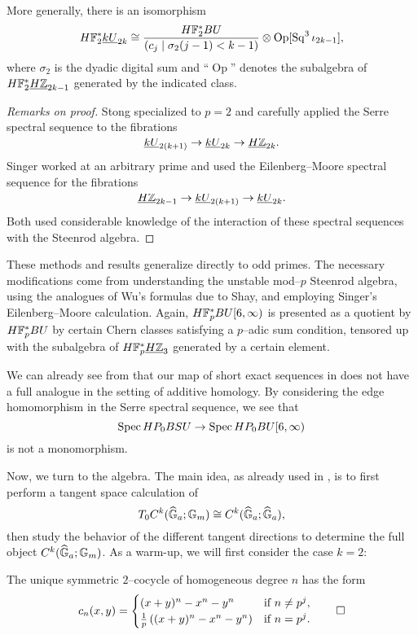 \begin{theorem}
More generally, there is an isomorphism \[H\mathbb F_2^* \underline{\smash{kU}}_{2k} \cong \frac{H\mathbb F_2^* BU}{(c_j \mid \sigma_2(j - 1) < k - 1)} \otimes \operatorname{Op}[\operatorname{Sq}^3 \iota_{2k-1}],\] where $\sigma_2$ is the dyadic digital sum and ``$\operatorname{Op}$'' denotes the subalgebra of $H\mathbb F_2^* \underline{\smash{H\mathbb Z}}_{2k-1}$ generated by the indicated class.
\end{theorem}
\begin{proof}[Remarks on proof]
Stong specialized to $p = 2$ and carefully applied the Serre spectral sequence to the fibrations \[\underline{\smash{kU}}_{2(k+1)} \to \underline{\smash{kU}}_{2k} \to \underline{\smash{H\mathbb Z}}_{2k}.\]  Singer worked at an arbitrary prime and used the Eilenberg--Moore spectral sequence for the fibrations \[\underline{\smash{H\mathbb Z}}_{2k-1} \to \underline{\smash{kU}}_{2(k+1)} \to \underline{\smash{kU}}_{2k}.\]  Both used considerable knowledge of the interaction of these spectral sequences with the Steenrod algebra.
\end{proof}

\begin{remark}
These methods and results generalize directly to odd primes.  The necessary modifications come from understanding the unstable mod--$p$ Steenrod algebra, using the analogues of Wu's formulas due to Shay, and employing Singer's Eilenberg--Moore calculation.  Again, $H\mathbb F_p^* BU[6, \infty)$ is presented as a quotient by $H\mathbb F_p^* BU$ by certain Chern classes satisfying a $p$--adic sum condition, tensored up with the subalgebra of $H\mathbb F_p^* \underline{\smash{H\mathbb Z}}_{3}$ generated by a certain element.
\end{remark}

\begin{remark}
We can already see from  that our map of short exact sequences in  does not have a full analogue in the setting of additive homology.  By considering the edge homomorphism in the Serre spectral sequence, we see that \[\operatorname{Spec} HP_0 BSU \to \operatorname{Spec} HP_0 BU[6, \infty)\] is not a monomorphism.
\end{remark}





Now, we turn to the algebra.  The main idea, as already used in , is to first perform a tangent space calculation of \[T_0 C^k(\widehat{\mathbb G}_a; \mathbb G_m) \cong C^k(\widehat{\mathbb G}_a; \widehat{\mathbb G}_a),\] then study the behavior of the different tangent directions to determine the full object $C^k(\widehat{\mathbb G}_a; \mathbb G_m)$.  As a warm-up, we will first consider the case $k = 2$:
\begin{corollary}
The unique symmetric $2$--cocycle of homogeneous degree $n$ has the form \[c_n(x, y) = \begin{cases} (x + y)^n - x^n - y^n & \text{if $n \ne p^j$}, \\ \frac{1}{p} \left( (x + y)^n - x^n - y^n \right) & \text{if $n = p^j$}. \end{cases} \qed\]
\end{corollary}

